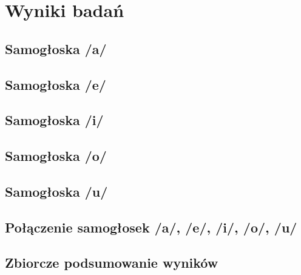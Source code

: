 \chapter{Wyniki badań}

\section{Samogłoska /a/}
\label{sec:samogloska-a}


\section{Samogłoska /e/}
\label{sec:samogloska-e}


\section{Samogłoska /i/}
\label{sec:samogloska-i}


\section{Samogłoska /o/}
\label{sec:samogloska-o}


\section{Samogłoska /u/}
\label{sec:samogloska-u}

\section{Połączenie samogłosek /a/, /e/, /i/, /o/, /u/}
\label{sec:samogloski}


\section{Zbiorcze podsumowanie wyników}
\label{sec:podsumowanie-wynikow}